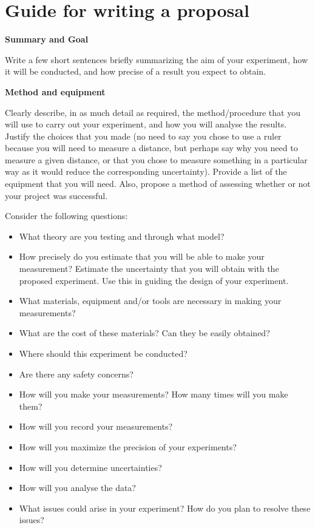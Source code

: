 \section{Guide for writing a proposal}
 \vspace{0.25cm}
\textbf{Summary and Goal}

Write a few short sentences briefly summarizing the aim of your experiment, how it will be conducted, and how precise of a result you expect to obtain.

\textbf{Method and equipment}

Clearly describe, in as much detail as required, the method/procedure that you will use to carry out your experiment, and how you will analyse the results. Justify the choices that you made (no need to say you chose to use a ruler because you will need to measure a distance, but perhaps say why you need to measure a given distance, or that you chose to measure something in a particular way as it would reduce the corresponding uncertainty). Provide a list of the equipment that you will need. Also, propose a method of assessing whether or not your project was successful. 

Consider the following questions:
\begin{itemize}
\item What theory are you testing and through what model?
\item How precisely do you estimate that you will be able to make your measurement? Estimate the uncertainty that you will obtain with the proposed experiment. Use this in guiding the design of your experiment.
\item What materials, equipment and/or tools are necessary in making your measurements?
\item What are the cost of these materials? Can they be easily obtained?
\item Where should this experiment be conducted? 
\item Are there any safety concerns?
\item How will you make your measurements? How many times will you make them?
\item How will you record your measurements?
\item How will you maximize the precision of your experiments?
\item How will you determine uncertainties? 
\item How will you analyse the data?
\item What issues could arise in your experiment? How do you plan to resolve these issues?
\end{itemize}

